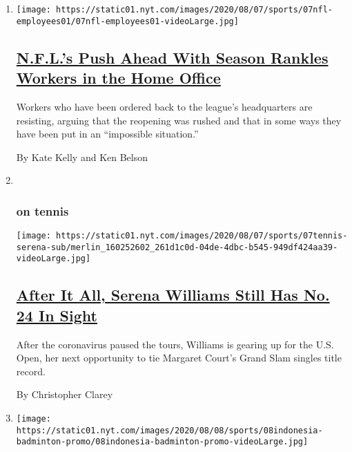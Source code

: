 \begin{enumerate}
\def\labelenumi{\arabic{enumi}.}
\item
  \texttt{[image: https://static01.nyt.com/images/2020/08/07/sports/07nfl-employees01/07nfl-employees01-videoLarge.jpg]}

  \hypertarget{nfls-push-ahead-with-season-rankles-workers-in-the-home-office}{%
  \subsection{\texorpdfstring{\href{/2020/08/07/sports/football/coronavirus-nfl-restart-season.html}{N.F.L.'s
  Push Ahead With Season Rankles Workers in the Home
  Office}}{N.F.L.'s Push Ahead With Season Rankles Workers in the Home Office}}\label{nfls-push-ahead-with-season-rankles-workers-in-the-home-office}}

  Workers who have been ordered back to the league's headquarters are
  resisting, arguing that the reopening was rushed and that in some ways
  they have been put in an ``impossible situation.''

  By Kate Kelly and Ken Belson
\item ~
  \hypertarget{on-tennis}{%
  \subsubsection{on tennis}\label{on-tennis}}

  \texttt{[image: https://static01.nyt.com/images/2020/08/07/sports/07tennis-serena-sub/merlin\_160252602\_261d1c0d-04de-4dbc-b545-949df424aa39-videoLarge.jpg]}

  \hypertarget{after-it-all-serena-williams-still-has-no-24-in-sight}{%
  \subsection{\texorpdfstring{\href{/2020/08/07/sports/tennis/serena-williams-us-open.html}{After
  It All, Serena Williams Still Has No. 24 In
  Sight}}{After It All, Serena Williams Still Has No. 24 In Sight}}\label{after-it-all-serena-williams-still-has-no-24-in-sight}}

  After the coronavirus paused the tours, Williams is gearing up for the
  U.S. Open, her next opportunity to tie Margaret Court's Grand Slam
  singles title record.

  By Christopher Clarey
\item
  \texttt{[image: https://static01.nyt.com/images/2020/08/08/sports/08indonesia-badminton-promo/08indonesia-badminton-promo-videoLarge.jpg]}


\end{enumerate}
